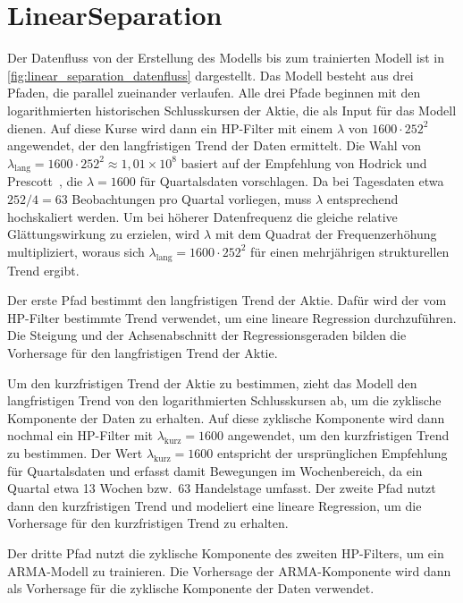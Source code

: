 \section{LinearSeparation}\label{sec:linear_separation}
Der Datenfluss von der Erstellung des Modells bis zum trainierten Modell ist in \cref{fig:linear_separation_datenfluss} dargestellt. Das Modell besteht aus drei Pfaden, die parallel zueinander verlaufen. Alle drei Pfade beginnen mit den logarithmierten historischen Schlusskursen der Aktie, die als Input für das Modell dienen. Auf diese Kurse wird dann ein HP-Filter mit einem $\lambda$ von $1600 \cdot 252^2$ angewendet, der den langfristigen Trend der Daten ermittelt. Die Wahl von $\lambda_{\text{lang}} = 1600 \cdot 252^2 \approx 1{,}01 \times 10^8$ basiert auf der Empfehlung von Hodrick und Prescott~\cite{hodrick1997postwar}, die $\lambda = 1600$ für Quartalsdaten vorschlagen. Da bei Tagesdaten etwa $252/4 = 63$ Beobachtungen pro Quartal vorliegen, muss $\lambda$ entsprechend hochskaliert werden. Um bei höherer Datenfrequenz die gleiche relative Glättungswirkung zu erzielen, wird $\lambda$ mit dem Quadrat der Frequenzerhöhung multipliziert, woraus sich $\lambda_{\text{lang}} = 1600 \cdot 252^2$ für einen mehrjährigen strukturellen Trend ergibt.

Der erste Pfad bestimmt den langfristigen Trend der Aktie. Dafür wird der vom HP-Filter bestimmte Trend verwendet, um eine lineare Regression durchzuführen. Die Steigung und der Achsenabschnitt der Regressionsgeraden bilden die Vorhersage für den langfristigen Trend der Aktie.

Um den kurzfristigen Trend der Aktie zu bestimmen, zieht das Modell den langfristigen Trend von den logarithmierten Schlusskursen ab, um die zyklische Komponente der Daten zu erhalten. Auf diese zyklische Komponente wird dann nochmal ein HP-Filter mit $\lambda_{\text{kurz}} = 1600$ angewendet, um den kurzfristigen Trend zu bestimmen. Der Wert $\lambda_{\text{kurz}} = 1600$ entspricht der ursprünglichen Empfehlung für Quartalsdaten und erfasst damit Bewegungen im Wochenbereich, da ein Quartal etwa 13 Wochen bzw.\ 63 Handelstage umfasst. Der zweite Pfad nutzt dann den kurzfristigen Trend und modeliert eine lineare Regression, um die Vorhersage für den kurzfristigen Trend zu erhalten.

Der dritte Pfad nutzt die zyklische Komponente des zweiten HP-Filters, um ein ARMA-Modell zu trainieren. Die Vorhersage der ARMA-Komponente wird dann als Vorhersage für die zyklische Komponente der Daten verwendet.

